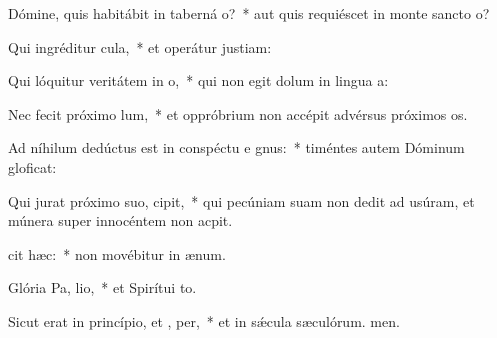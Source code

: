 \item Dómine, quis habitábit in taberná o?~* aut quis requiéscet in monte sancto o?
\item Qui ingréditur  cula,~* et operátur justiam:
\item Qui lóquitur veritátem in  o,~* qui non egit dolum in lingua a:
\item Nec fecit próximo  lum,~* et oppróbrium non accépit advérsus próximos os.
\item Ad níhilum dedúctus est in conspéctu e gnus:~* timéntes autem Dóminum gloficat:
\item Qui jurat próximo suo,   cipit,~* qui pecúniam suam non dedit ad usúram, et múnera super innocéntem non acpit.
\item {} cit hæc:~* non movébitur in ænum.
\item Glória Pa,  lio,~* et Spirítui to.
\item Sicut erat in princípio, et ,  per,~* et in sǽcula sæculórum. men.
